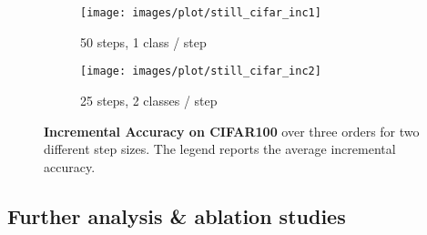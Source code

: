 \documentclass[runningheads]{llncs}
\begin{document}
\captionsetup[table]{skip=10pt}
 \begin{figure*}[tb]
  \centering
  \begin{subfigure}[b]{0.48\linewidth}
    \texttt{[image: images/plot/still\_cifar\_inc1]}
    \caption{50 steps, 1 class / step}
    \label{fig:cifar_inc1}
  \end{subfigure}
  \hfill
  \begin{subfigure}[b]{0.48\linewidth}
    \texttt{[image: images/plot/still\_cifar\_inc2]}
    \caption{25 steps, 2 classes / step}
    \label{fig:cifar_inc2}
  \end{subfigure}
  \caption{\textbf{Incremental Accuracy on CIFAR100} over three orders for two different step sizes. The legend reports the average incremental accuracy.}
  \label{fig:plots}
\end{figure*}



\begin{comment}
\begin{figure*}[tb]
  \centering
  \begin{subfigure}[b]{0.24\linewidth}
    \texttt{[image: images/plot/still\_cifar\_inc1-crop]}
    \caption{50 steps}
    \label{fig:cifar_inc1}
  \end{subfigure}
  \hfill
  \begin{subfigure}[b]{0.24\linewidth}
    \texttt{[image: images/plot/still\_cifar\_inc2-crop]}
    \caption{25 steps}
    \label{fig:cifar_inc2}
  \end{subfigure}
  \hfill
  \begin{subfigure}[b]{0.24\linewidth}
    \texttt{[image: images/plot/still\_cifar\_inc5-crop]}
    \caption{10 steps}
    \label{fig:cifar_inc5}
  \end{subfigure}
  \hfill
  \begin{subfigure}[b]{0.24\linewidth}
    \texttt{[image: images/plot/still\_cifar\_inc10-crop]}
    \caption{5 steps}
    \label{fig:cifar_inc10}
  \end{subfigure}
  
  \caption{Average incremental accuracy on CIFAR100 over three random class orders for four different step sizes.}
  \label{fig:plots}
\end{figure*}
\end{comment} 
\subsection{Further analysis \& ablation studies}
\label{sec:ablation}
\end{document}
